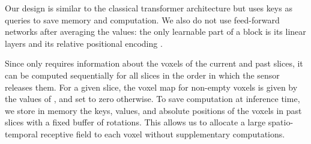 \documentclass[runningheads]{tpls/llncs}
\begin{document}
Our design is similar to the classical transformer architecture but uses keys as queries to save memory and computation. We also do not use feed-forward networks after averaging the values: the only learnable part of a block  is its linear layers  and its relative positional encoding . 

Since  only requires information about the voxels of the current and past slices, it can be computed sequentially for all slices in the order in which the sensor releases them. 
For a given slice, the voxel map  for non-empty voxels is given by the values of , and set to zero otherwise.
To save computation at inference time, we store in memory the keys, values, and absolute positions of the voxels in  past slices with a fixed buffer of  rotations. This allows us to allocate a large spatio-temporal receptive field to each voxel without supplementary computations. 

\end{document}
